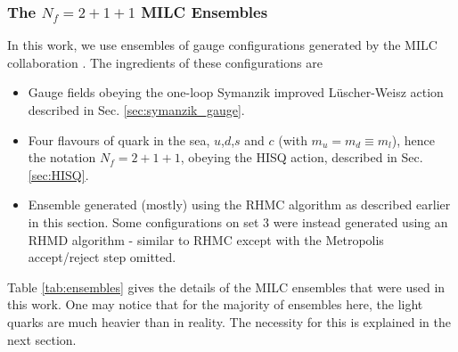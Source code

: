 \subsubsection{The $N_f=2+1+1$ MILC Ensembles}
\label{sec:MILCensembles}

In this work, we use ensembles of gauge configurations generated by the MILC collaboration \cite{Bazavov:2012xda,Bazavov:2010ru}. The ingredients of these configurations are
\begin{itemize}
\item
  Gauge fields obeying the one-loop Symanzik improved L\"uscher-Weisz action described in Sec. \ref{sec:symanzik_gauge}.
\item
  Four flavours of quark in the sea, $u$,$d$,$s$ and $c$ (with $m_u=m_d\equiv m_l$), hence the notation $N_f=2+1+1$, obeying the HISQ action, described in Sec. \ref{sec:HISQ}.
\item
  Ensemble generated (mostly) using the RHMC algorithm as described earlier in this section. Some configurations on set 3 were instead generated using an RHMD algorithm - similar to RHMC except with the Metropolis accept/reject step omitted.
\end{itemize}
Table \ref{tab:ensembles} gives the details of the MILC ensembles that were used in this work. One may notice that for the majority of ensembles here, the light quarks are much heavier than in reality. The necessity for this is explained in the next section.

